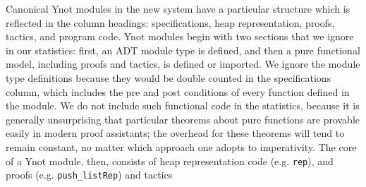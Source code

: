 \documentclass[preprint,nocopyrightspace]{sigplanconf}
\newcommand{\cd}[1]{\texttt{#1}}
\begin{document}
Canonical Ynot modules in the new system have a particular structure
which is reflected in the column headings: specifications, heap
representation, proofs, tactics, and program code.  Ynot modules begin
with two sections that we ignore in our statistics: first, an ADT
module type is defined, and then a pure functional model, including
proofs and tactics, is defined or imported.  We ignore the module type
definitions because they would be double counted in the specifications
column, which includes the pre and post conditions of every function
defined in the module.  We do not include such functional code in the
statistics, because it is generally unsurprising that particular
theorems about pure functions are provable easily in modern proof
assistants; the overhead for these theorems will tend to remain
constant, no matter which approach one adopts to imperativity.  The
core of a Ynot module, then, consists of heap representation code
(e.g. \cd{rep}), and proofs (e.g. \cd{push\_listRep}) and tactics
\end{document}
